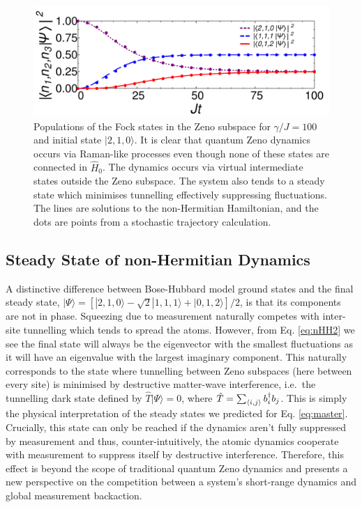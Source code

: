\begin{figure}[hbtp!]
	\includegraphics[width=\linewidth]{comp}
	\caption[Fock State Populations in a Zeno
        Subspace]{Populations of the Fock states in the Zeno subspace
          for $\gamma/J = 100$ and initial state $| 2,1,0 \rangle$. It
          is clear that quantum Zeno dynamics occurs via Raman-like
          processes even though none of these states are connected in
          $\hat{H}_0$. The dynamics occurs via virtual intermediate
          states outside the Zeno subspace. The system also tends to a
          steady state which minimises tunnelling effectively
          suppressing fluctuations. The lines are solutions to the
          non-Hermitian Hamiltonian, and the dots are points from a
          stochastic trajectory calculation.\label{fig:comp}}
\end{figure}

\subsection{Steady State of non-Hermitian Dynamics}

A distinctive difference between Bose-Hubbard model ground states and
the final steady state,
$| \Psi \rangle = [|2,1,0 \rangle - \sqrt{2} |1,1,1\rangle +
|0,1,2\rangle]/2$, is that its components are not in phase. Squeezing
due to measurement naturally competes with inter-site tunnelling which
tends to spread the atoms. However, from Eq. \eqref{eq:nHH2} we see
the final state will always be the eigenvector with the smallest
fluctuations as it will have an eigenvalue with the largest imaginary
component. This naturally corresponds to the state where tunnelling
between Zeno subspaces (here between every site) is minimised by
destructive matter-wave interference, i.e.~the tunnelling dark state
defined by $\hat{T} |\Psi \rangle = 0$, where
$\hat{T} = \sum_{\langle i, j \rangle} b^\dagger_i b_j$. This is simply the
physical interpretation of the steady states we predicted for
Eq. \eqref{eq:master}. Crucially, this state can only be reached if
the dynamics aren't fully suppressed by measurement and thus,
counter-intuitively, the atomic dynamics cooperate with measurement to
suppress itself by destructive interference. Therefore, this effect is
beyond the scope of traditional quantum Zeno dynamics and presents a
new perspective on the competition between a system's short-range
dynamics and global measurement backaction.

